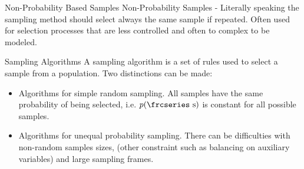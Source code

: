 \documentclass{beamer}\usepackage[]{graphicx}\usepackage[]{color}
\newcommand{\textfrc}[1]{{\frcseries#1}}
\newcommand{\mathfrc}[1]{\text{\textfrc{#1}}}
\begin{document}
\begin{frame}{Non-Probability Based Samples}
Non-Probability Samples - Literally speaking the sampling method should select always the same sample if repeated. Often used for selection processes that are less controlled and often to complex to be modeled. 
\end{frame}



\begin{frame}{Sampling Algorithms}
A sampling algorithm is a set of rules used to select a sample from a population. Two distinctions can be made:
\begin{itemize}
\item<2-> Algorithms for simple random sampling. 
All samples have the same probability of being selected, i.e. $p(\mathfrc{s})$ is constant for all possible samples.
\item<3-> Algorithms for unequal probability sampling. There can be difficulties with non-random samples sizes, (other constraint such as balancing on auxiliary variables) and large sampling frames.
\end{itemize}

\end{frame}
\end{document}
